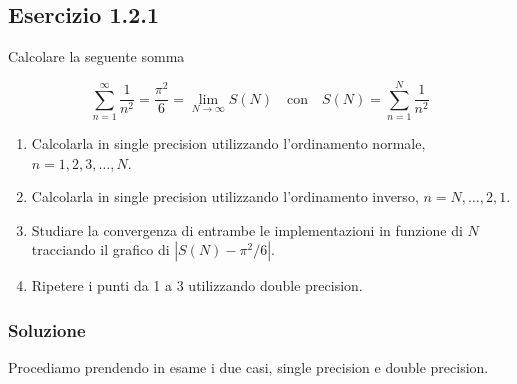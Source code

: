 \documentclass[letterpaper, 12pt]{article}
\numberwithin{equation}{section}    %
\begin{document}
\subsection{Esercizio 1.2.1}
Calcolare la seguente somma

\begin{equation}
    \sum_{n=1}^\infty \frac{1}{n^2}=\frac{\pi^2}{6}
    =\lim_{N\to\infty} S(N)
    \quad
    \text{con}
    \quad
    S(N)=\sum_{n=1}^N \frac{1}{n^2}
\end{equation}

\begin{enumerate}
    \item Calcolarla in single precision utilizzando l'ordinamento normale, $n=1,2,3,\ldots,N$.
    \item Calcolarla  in single precision utilizzando l'ordinamento inverso, $n=N,\ldots,2,1$.
    \item Studiare la convergenza di entrambe le implementazioni in funzione di $N$ tracciando il grafico di $|S(N)-\pi^2/6|$.
    \item Ripetere i punti da 1 a 3 utilizzando double precision.
\end{enumerate}

\subsubsection{Soluzione}
Procediamo prendendo in esame i due casi, single precision e double precision.
\end{document}
